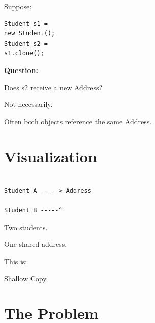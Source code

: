 \documentclass[11pt,a4paper]{book}
\begin{document}
Suppose:

\begin{verbatim}
Student s1 =
new Student();
Student s2 =
s1.clone();
\end{verbatim}


\textbf{Question:}


Does s2 receive a new Address?


Not necessarily.


Often both objects reference
the same Address.


\section{Visualization}

\begin{verbatim}

Student A -----> Address

Student B -----^

\end{verbatim}


Two students.


One shared address.


This is:


Shallow Copy.


\section{The Problem}
\end{document}
